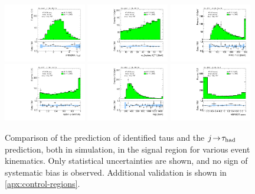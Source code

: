 \begin{figure}[tp]
  \centering
  \includegraphics[width=0.32\textwidth]{figures/analysis/vbf-MCXSR/taulep-dR}
  \includegraphics[width=0.32\textwidth]{figures/analysis/vbf-MCXSR/mT}
  \includegraphics[width=0.32\textwidth]{figures/analysis/vbf-MCXSR/mMMC} \\
  \includegraphics[width=0.32\textwidth]{figures/analysis/vbf-MCXSR/lep-eta-centrality}
  \includegraphics[width=0.32\textwidth]{figures/analysis/vbf-MCXSR/dijet-m-high}
  \includegraphics[width=0.32\textwidth]{figures/analysis/vbf-MCXSR/BDTEve-VBF} \\
  \caption{Comparison of the prediction of identified taus and the $j\!\rightarrow\!\tau_\text{had}$ prediction, both in simulation, in the signal region for various event kinematics. Only statistical uncertainties are shown, and no sign of systematic bias is observed. Additional validation is shown in \cref{apx:control-regions}.}
  \label{fig:backgrounds-MCXSR}
\end{figure}

